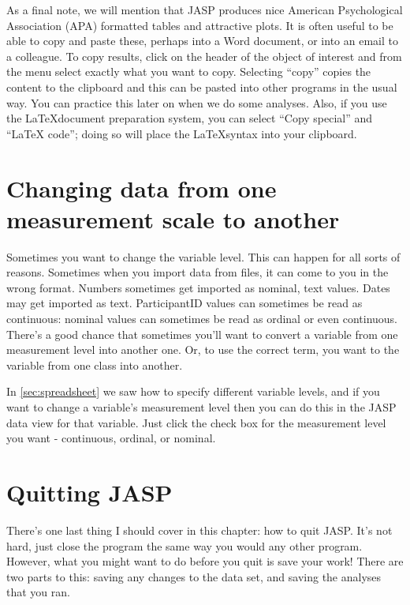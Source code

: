 
As a final note, we will mention that JASP produces nice American Psychological Association (APA) formatted tables and attractive plots. It is often useful to be able to copy and paste these, perhaps into a Word document, or into an email to a colleague. To copy results, click on the header of the object of interest and from the menu select exactly what you want to copy. Selecting ``copy'' copies the content to the clipboard and this can be pasted into other programs in the usual way. You can practice this later on when we do some analyses. Also, if you use the \LaTeX document preparation system, you can select ``Copy special'' and ``LaTeX code''; doing so will place the \LaTeX syntax into your clipboard.


\section{Changing data from one measurement scale to another\label{sec:coercion}}

Sometimes you want to change the variable level. This can happen for all sorts of reasons. Sometimes when you import data from files, it can come to you in the wrong format. Numbers sometimes get imported as nominal, text values. Dates may get imported as text. ParticipantID values can sometimes be read as continuous: nominal values can sometimes be read as ordinal or even continuous. There's a good chance that sometimes you'll want to convert a variable from one measurement level into another one. Or, to use the correct term, you want to  the variable from one class into another. 

In \ref{sec:spreadsheet} we saw how to specify different variable levels, and if you want to change a variable's measurement level then you can do this in the JASP data view for that variable. Just click the check box for the measurement level you want - continuous, ordinal, or nominal. 


\section{Quitting JASP \label{sec:quittingjasp}}

There's one last thing I should cover in this chapter: how to quit JASP. It's not hard, just close the program the same way you would any other program. However, what you might want to do before you quit is save your work! There are two parts to this: saving any changes to the data set, and saving the analyses that you ran.

